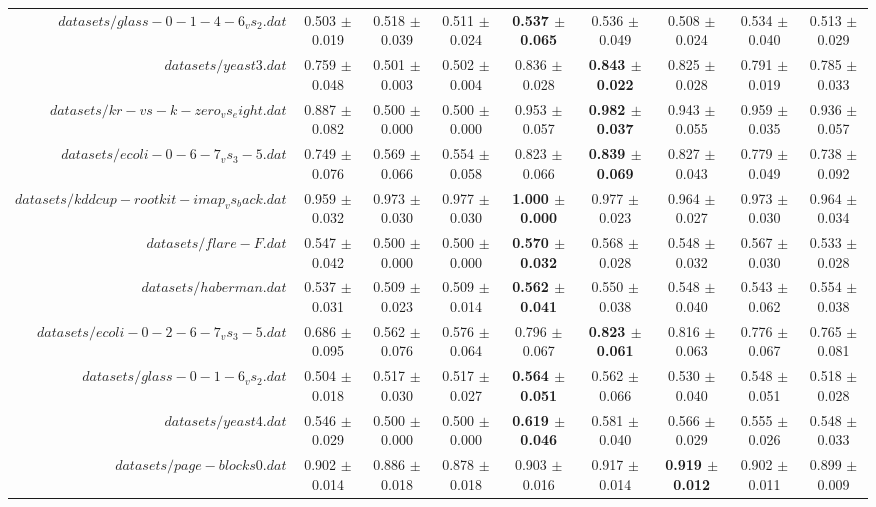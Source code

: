 \begin{table}[!ht]
{\begin{tabular}{r c c c c c c c c}
$datasets/glass-0-1-4-6_vs_2.dat$ & 0.503 $\pm$ 0.019 & 0.518 $\pm$ 0.039 & 0.511 $\pm$ 0.024 & \textbf{0.537 $\pm$ 0.065} & 0.536 $\pm$ 0.049 & 0.508 $\pm$ 0.024 & 0.534 $\pm$ 0.040 & 0.513 $\pm$ 0.029 \\
$datasets/yeast3.dat$ & 0.759 $\pm$ 0.048 & 0.501 $\pm$ 0.003 & 0.502 $\pm$ 0.004 & 0.836 $\pm$ 0.028 & \textbf{0.843 $\pm$ 0.022} & 0.825 $\pm$ 0.028 & 0.791 $\pm$ 0.019 & 0.785 $\pm$ 0.033 \\
$datasets/kr-vs-k-zero_vs_eight.dat$ & 0.887 $\pm$ 0.082 & 0.500 $\pm$ 0.000 & 0.500 $\pm$ 0.000 & 0.953 $\pm$ 0.057 & \textbf{0.982 $\pm$ 0.037} & 0.943 $\pm$ 0.055 & 0.959 $\pm$ 0.035 & 0.936 $\pm$ 0.057 \\
$datasets/ecoli-0-6-7_vs_3-5.dat$ & 0.749 $\pm$ 0.076 & 0.569 $\pm$ 0.066 & 0.554 $\pm$ 0.058 & 0.823 $\pm$ 0.066 & \textbf{0.839 $\pm$ 0.069} & 0.827 $\pm$ 0.043 & 0.779 $\pm$ 0.049 & 0.738 $\pm$ 0.092 \\
$datasets/kddcup-rootkit-imap_vs_back.dat$ & 0.959 $\pm$ 0.032 & 0.973 $\pm$ 0.030 & 0.977 $\pm$ 0.030 & \textbf{1.000 $\pm$ 0.000} & 0.977 $\pm$ 0.023 & 0.964 $\pm$ 0.027 & 0.973 $\pm$ 0.030 & 0.964 $\pm$ 0.034 \\
$datasets/flare-F.dat$ & 0.547 $\pm$ 0.042 & 0.500 $\pm$ 0.000 & 0.500 $\pm$ 0.000 & \textbf{0.570 $\pm$ 0.032} & 0.568 $\pm$ 0.028 & 0.548 $\pm$ 0.032 & 0.567 $\pm$ 0.030 & 0.533 $\pm$ 0.028 \\
$datasets/haberman.dat$ & 0.537 $\pm$ 0.031 & 0.509 $\pm$ 0.023 & 0.509 $\pm$ 0.014 & \textbf{0.562 $\pm$ 0.041} & 0.550 $\pm$ 0.038 & 0.548 $\pm$ 0.040 & 0.543 $\pm$ 0.062 & 0.554 $\pm$ 0.038 \\
$datasets/ecoli-0-2-6-7_vs_3-5.dat$ & 0.686 $\pm$ 0.095 & 0.562 $\pm$ 0.076 & 0.576 $\pm$ 0.064 & 0.796 $\pm$ 0.067 & \textbf{0.823 $\pm$ 0.061} & 0.816 $\pm$ 0.063 & 0.776 $\pm$ 0.067 & 0.765 $\pm$ 0.081 \\
$datasets/glass-0-1-6_vs_2.dat$ & 0.504 $\pm$ 0.018 & 0.517 $\pm$ 0.030 & 0.517 $\pm$ 0.027 & \textbf{0.564 $\pm$ 0.051} & 0.562 $\pm$ 0.066 & 0.530 $\pm$ 0.040 & 0.548 $\pm$ 0.051 & 0.518 $\pm$ 0.028 \\
$datasets/yeast4.dat$ & 0.546 $\pm$ 0.029 & 0.500 $\pm$ 0.000 & 0.500 $\pm$ 0.000 & \textbf{0.619 $\pm$ 0.046} & 0.581 $\pm$ 0.040 & 0.566 $\pm$ 0.029 & 0.555 $\pm$ 0.026 & 0.548 $\pm$ 0.033 \\
$datasets/page-blocks0.dat$ & 0.902 $\pm$ 0.014 & 0.886 $\pm$ 0.018 & 0.878 $\pm$ 0.018 & 0.903 $\pm$ 0.016 & 0.917 $\pm$ 0.014 & \textbf{0.919 $\pm$ 0.012} & 0.902 $\pm$ 0.011 & 0.899 $\pm$ 0.009 \\

\end{tabular}}
\end{table}
